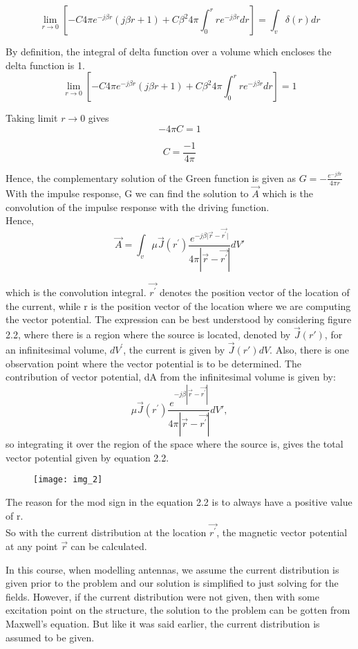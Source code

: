 	\begin{dmath*}
		\lim\limits_{r\rightarrow0} \left[-C4\pi e^{-j\beta r}(j\beta r+1) + C\beta^{2}4\pi\int_{0}^{r}re^{-j\beta r}dr\right] = \int_{v}\delta(r)dr
	\end{dmath*}
	
	By definition, the integral of delta function over a volume which encloses the delta function is 1.
	$$\lim\limits_{r\rightarrow0} \left[-C4\pi e^{-j\beta r}(j\beta r+1) + C\beta^{2}4\pi\int_{0}^{r}re^{-j\beta r}dr\right] = 1$$
	
	Taking limit $r\rightarrow0$ gives
	$$-4\pi C= 1$$
	
	$$C = \frac{-1}{4\pi}$$
	
	Hence, the complementary solution of the Green function is given as $ G= -\frac{e^{-j\beta r}}{4\pi r}$
	With the impulse response, G we can find the solution to $\vec{A}$ which is the convolution of the impulse response with the driving function.\\
	Hence, 
	\begin{equation}
	     \vec{A}=\int_{v}\mu\vec{J}(r^{'}) \frac{e^{-j\beta\vert\vec{r}-\vec{r^{'}}\vert}}{4\pi|\vec{r}-\vec{r^{'}}|}dV'
	\end{equation}
	
	which is the convolution integral. $\vec{r^{'}}$ denotes the position vector of the location of the current, while r is the position vector of the location where we are computing the vector potential. The expression can be best understood by considering figure 2.2, where there is a region where the source is located, denoted by $\vec{J}(r')$, for an infinitesimal volume, $dV^{'}$, the current is given by $\vec{J}(r')dV$. Also, there is one observation point where the vector potential is to be determined. The contribution of vector potential, dA from the infinitesimal volume is given by: 
	\begin{equation}
		\mu\vec{J}(r^{'}) \frac{e^{-j\beta|\vec{r}-\vec{r^{'}}|}}{4\pi|\vec{r}-\vec{r^{'}}|}dV',
	\end{equation}
so integrating it over the region of the space where the source is, gives the total vector potential given by equation 2.2.
		\begin{figure}[H]
		\texttt{[image: img\_2]}
		\centering
		\caption{}
		\label{fig:1}
		\vspace{-10pt}
	\end{figure}\newline
	The reason for the mod sign in the equation 2.2 is to always have a positive value of r.\\
	So with the current distribution at the location $\vec{r^{'}}$, the magnetic vector potential at any point $\vec{r}$ can be calculated.\\
	\par In this course, when modelling antennas, we assume the current distribution is given prior to the problem and our solution is simplified to just solving for the fields. However, if the current distribution were not given, then with some excitation point on the structure, the solution to the problem can be gotten from Maxwell's equation. But like it was said earlier, the current distribution is assumed to be given.